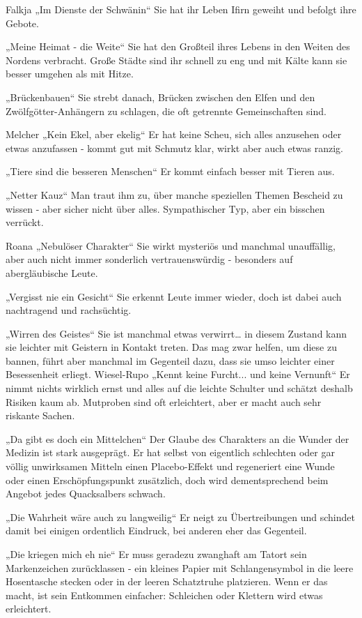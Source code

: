 Falkja
„Im Dienste der Schwänin“
Sie hat ihr Leben Ifirn geweiht und befolgt ihre Gebote.

„Meine Heimat - die Weite“
Sie hat den Großteil ihres Lebens in den Weiten des Nordens verbracht. Große Städte sind ihr schnell zu eng und mit Kälte kann sie besser umgehen als mit Hitze.

„Brückenbauen“
Sie strebt danach, Brücken zwischen den Elfen und den Zwölfgötter-Anhängern zu schlagen, die oft getrennte Gemeinschaften sind.


Melcher
„Kein Ekel, aber ekelig“
Er hat keine Scheu, sich alles anzusehen oder etwas anzufassen - kommt gut mit Schmutz klar,  wirkt aber auch etwas ranzig.

„Tiere sind die besseren Menschen“
Er kommt einfach besser mit Tieren aus.

„Netter Kauz“
Man traut ihm zu, über manche speziellen Themen Bescheid zu wissen - aber sicher nicht über alles. Sympathischer Typ, aber ein bisschen verrückt.


Roana
„Nebulöser Charakter“
Sie wirkt mysteriös und manchmal unauffällig, aber auch nicht immer sonderlich vertrauenswürdig - besonders auf abergläubische Leute.

„Vergisst nie ein Gesicht“
Sie erkennt Leute immer wieder, doch ist dabei auch nachtragend und rachsüchtig.

„Wirren des Geistes“
Sie ist manchmal etwas verwirrt… in diesem Zustand kann sie leichter mit Geistern in Kontakt treten. Das mag zwar helfen, um diese zu bannen, führt aber manchmal im Gegenteil dazu, dass sie umso leichter einer Besessenheit erliegt.
Wiesel-Rupo
„Kennt keine Furcht... und keine Vernunft“
Er nimmt nichts wirklich ernst und alles auf die leichte Schulter und schätzt deshalb Risiken kaum ab. Mutproben sind oft erleichtert, aber er macht auch sehr riskante Sachen.

„Da gibt es doch ein Mittelchen“
Der Glaube des Charakters an die Wunder der Medizin ist stark ausgeprägt. Er hat selbst von eigentlich schlechten oder gar völlig unwirksamen Mitteln einen Placebo-Effekt und regeneriert eine Wunde oder einen Erschöpfungspunkt zusätzlich, doch wird dementsprechend beim Angebot jedes Quacksalbers schwach.

„Die Wahrheit wäre auch zu langweilig“
Er neigt zu Übertreibungen und schindet damit bei einigen ordentlich Eindruck, bei anderen eher das Gegenteil. 

„Die kriegen mich eh nie“
Er muss geradezu zwanghaft am Tatort sein Markenzeichen zurücklassen - ein kleines Papier mit Schlangensymbol in die leere Hosentasche stecken oder in der leeren Schatztruhe platzieren. Wenn er das macht, ist sein Entkommen einfacher: Schleichen oder Klettern wird etwas erleichtert.

\spaltenende